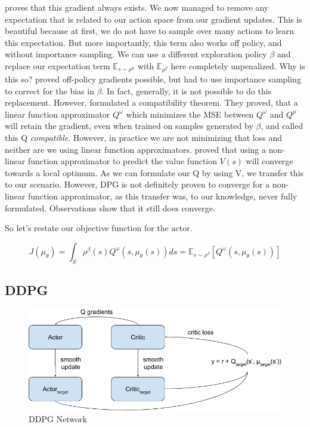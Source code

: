 \documentclass[hyperref,german,beleg]{cgvpub}
\begin{document}
\cite[Theorem 1]{silverDeterministicPolicyGradient2013} proves that this gradient always exists. We now managed to remove any expectation that is related to our action space from our gradient updates. This is beautiful because at first, we do not have to sample over many actions to learn this expectation. But more importantly, this term also works off policy, and without importance sampling. We can use a different exploration policy $\beta$ and replace our expectation term $\mathbb{E}_{s \sim \rho^{\mu}}$ with $\mathbb{E}_{\rho^{\beta}}$ here completely unpenalized. Why is this so? \cite{degrisOffPolicyActorCritic2013} proved off-policy gradients possible, but had to use importance sampling to correct for the bias in $\beta$. In fact, generally, it is not possible to do this replacement. However, \cite[Section 4.3]{silverDeterministicPolicyGradient2013} formulated a compatibility theorem. They proved, that a linear function approximator $Q^{\omega}$ which minimizes the MSE between $Q^{\omega}$ and $Q^{\mu}$ will retain the gradient, even when trained on samples generated by $\beta$, and called this Q \textit{compatible}. However, in practice we are not minimizing that loss and neither are we using linear function approximators. \cite{bhatnagarConvergentTemporalDifferenceLearning2009} proved that using a non-linear function approximator to predict the value function $V(s)$ will converge towards a local optimum. As we can formulate our Q by using V, we transfer this to our scenario. However, \ac{DPG} is not definitely proven to converge for a non-linear function approximator, as this transfer was, to our knowledge, never fully formulated. Observations show that it still does converge.

So let's restate our objective function for the actor.

\begin{equation}
J(\mu_{\theta}) = \int_S \rho^{\beta}(s) Q^{\omega}(s,\mu_{\theta}(s)) ds = \mathbb{E}_{s \sim \rho^{\beta}}[Q^{\omega}(s,\mu_{\theta}(s))]
\end{equation}


\subsection{DDPG}

\begin{figure}
  \centering
  \includegraphics[width=0.6\linewidth]{DDPG_Setup.png}
  \caption{DDPG Network}
  \label{fig:ddpgsetup}
\end{figure}
\end{document}
